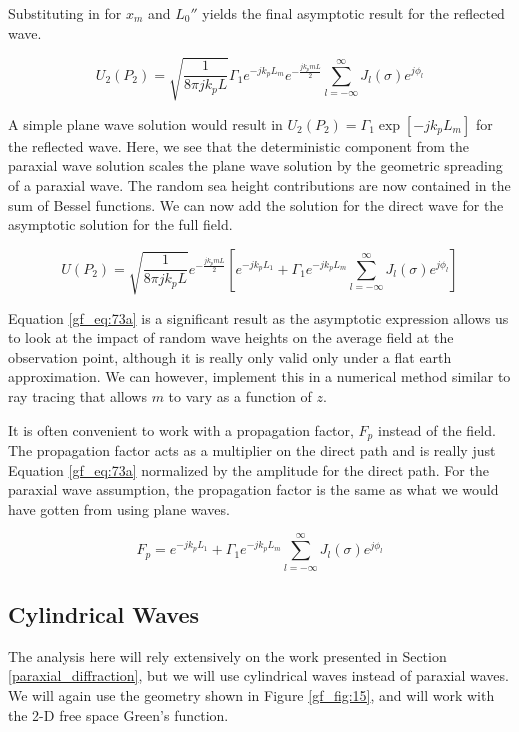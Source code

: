 \noindent Substituting in for $x_m$ and $L_0''$ yields the final asymptotic result for the reflected wave.

\begin{equation}
U_2(P_2) = \sqrt{\frac{1}{8\pi jk_p L}}\Gamma_1e^{-jk_pL_m} e^{-\frac{jk_pmL}{2}} \sum_{l=-\infty}^{\infty}J_l(\sigma)e^{j\phi_l}
\label{gf_eq:73}
\end{equation}
\renewcommand{\baselinestretch}{2} \small\normalsize

A simple plane wave solution would result in $U_2(P_2) = \Gamma_1\exp[-jk_pL_m]$ for the reflected wave. Here, we see that the deterministic component from the paraxial wave  solution scales the plane wave solution by the geometric spreading of a paraxial wave. The random sea height contributions are now contained in the sum of Bessel functions. We can now add the solution for the direct wave for the asymptotic solution for the full field.

\begin{equation}
\boxed{U(P_2) = \sqrt{\frac{1}{8\pi jk_p L}}e^{-\frac{jk_pmL}{2}} \left[e^{-jk_pL_1}+\Gamma_1e^{-jk_pL_m} \sum_{l=-\infty}^{\infty}J_l(\sigma)e^{j\phi_l}\right]}
\label{gf_eq:73a}
\end{equation}
\renewcommand{\baselinestretch}{2} \small\normalsize

Equation \ref{gf_eq:73a} is a significant result as the asymptotic expression allows us to look at the impact of random wave heights on the average field at the observation point, although it is really only valid only under a flat earth approximation. We can however, implement this in a numerical method similar to ray tracing that allows $m$ to vary as a function of $z$.

It is often convenient to work with a propagation factor, $F_p$ instead of the field. The propagation factor acts as a multiplier on the direct path and is really just Equation \ref{gf_eq:73a} normalized by the amplitude for the direct path. For the paraxial wave assumption, the propagation factor is the same as what we would have gotten from using plane waves.

\begin{equation}
F_p = e^{-jk_pL_1}+\Gamma_1e^{-jk_pL_m} \sum_{l=-\infty}^{\infty}J_l(\sigma)e^{j\phi_l}
\label{gf_eq:73ab}
\end{equation}
\renewcommand{\baselinestretch}{2} \small\normalsize

\subsection{Cylindrical Waves}\label{cylindrical_diffraction}
The analysis here will rely extensively on the work presented in Section \ref{paraxial_diffraction}, but we will use cylindrical waves instead of paraxial waves. We will again use the geometry shown in Figure \ref{gf_fig:15}, and will work with the 2-D free space Green's function.

